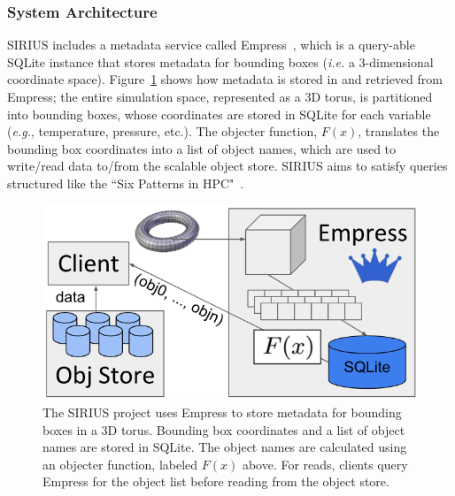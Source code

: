\subsubsection{System Architecture}

SIRIUS includes a metadata service called Empress~\cite{lawson:pdsw17-empress},
which is a query-able SQLite instance that stores metadata for bounding boxes
({\it i.e.} a 3-dimensional coordinate space).  Figure~\ref{fig:empress} shows
how metadata is stored in and retrieved from Empress; the entire simulation
space, represented as a 3D torus, is partitioned into bounding boxes, whose
coordinates are stored in SQLite for each variable ({\it e.g.}, temperature,
pressure, etc.).  The objecter function, \(F(x)\), translates the bounding box
coordinates into a list of object names, which are used to write/read data
to/from the scalable object store. SIRIUS aims to satisfy queries structured
like the ``Six Patterns in HPC"~\cite{lofstead:hpdc11-6degrees}. 


\begin{figure}[tb]
\centering
  \includegraphics[width=1\linewidth]{figures/empress.png}
  \caption{The SIRIUS project uses Empress to store metadata for bounding boxes
in a 3D torus. Bounding box coordinates and a list of object names are stored
in SQLite. The object names are calculated using an objecter function, labeled
\(F(x)\) above. For reads, clients query Empress for the object list before
reading from the object store.}
  \label{fig:empress}
\end{figure}

